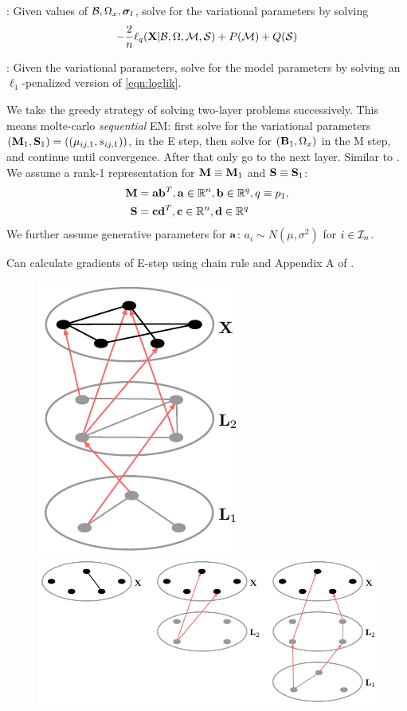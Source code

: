 \documentclass[11pt,letterpaper]{article}
\numberwithin{equation}{section}
\begin{document}
: Given values of ${\cal{B}},\Omega_x,{\boldsymbol{\sigma}}_l$, solve for the variational parameters by solving
%
$$
-\frac{2}{n} \ell_q({\mathbf{X}}|{\cal{B}},\Omega,{\cal{M}},{\cal{S}}) + P({\cal{M}}) + Q({\cal{S}})
$$

: Given the variational parameters, solve for the model parameters by solving an $\ell_1$-penalized version of \eqref{eqn:loglik}.

We take the greedy strategy of solving two-layer problems successively. This means molte-carlo {\it sequential} EM: first solve for the variational parameters $({\mathbf{M}}_1, {\mathbf{S}}_1) = ((\mu_{ij,1}, s_{ij,1}))$, in the E step, then solve for $({\mathbf{B}}_1,\Omega_x)$ in the M step, and continue until convergence. After that only go to the next layer. Similar to \cite{Hinton06, Bengio07}. We assume a rank-1 representation for ${\mathbf{M}} \equiv {\mathbf{M}}_1$ and ${\mathbf{S}} \equiv {\mathbf{S}}_1$:
\begin{align*}
{\mathbf{M}} &= {\bf{a}} {\bf{b}}^T, {\bf{a}} \in {\mathbb{R}}^n, {\bf{b}} \in {\mathbb{R}}^q, q \equiv p_1,\\
{\mathbf{S}} &= {\bf{c}} {\bf{d}}^T, {\bf{c}} \in {\mathbb{R}}^n, {\bf{d}} \in {\mathbb{R}}^q
\end{align*}
%
We further assume generative parameters for ${\bf{a}}$: $a_i \sim N(\mu,\sigma^2)$ for $i \in {\cal{I}}_n$.

Can calculate gradients of E-step using chain rule and Appendix A of \cite{FreyHinton99}.

\begin{figure}[t]
\centering
\includegraphics[height=.2\textheight]{latentmultilayer}
\includegraphics[height=.2\textheight]{latentinteractions}
\end{figure}
\end{document}
